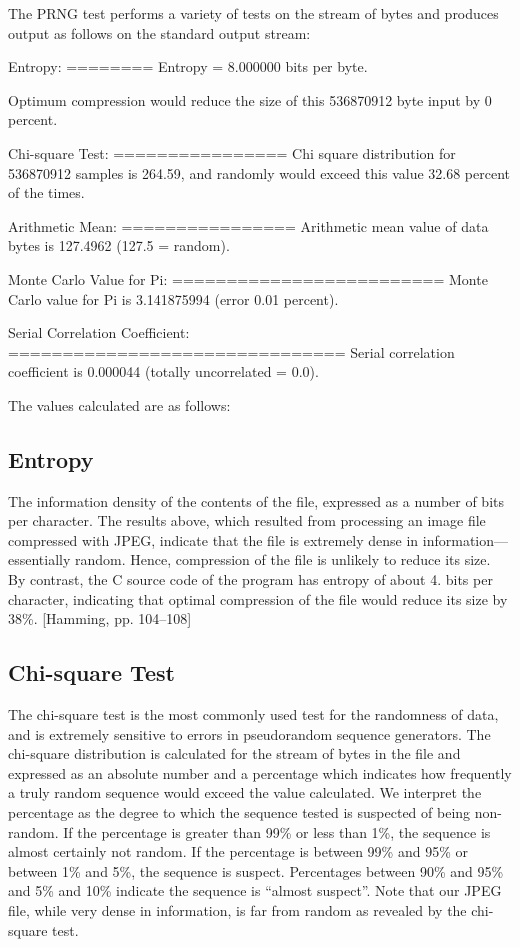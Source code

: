 The P\-R\-N\-G test performs a variety of tests on the stream of bytes and produces output as follows on the standard output stream\-: \begin{DoxyVerb}Entropy:
========
Entropy = 8.000000 bits per byte.

Optimum compression would reduce the size
of this 536870912 byte input by 0 percent.

Chi-square Test:
================
Chi square distribution for 536870912 samples is 264.59, and randomly
would exceed this value 32.68 percent of the times.

Arithmetic Mean:
================
Arithmetic mean value of data bytes is 127.4962 (127.5 = random).

Monte Carlo Value for Pi:
=========================
Monte Carlo value for Pi is 3.141875994 (error 0.01 percent).

Serial Correlation Coefficient:
===============================
Serial correlation coefficient is 0.000044 (totally uncorrelated = 0.0).
\end{DoxyVerb}


The values calculated are as follows\-:

\subsection*{Entropy}

The information density of the contents of the file, expressed as a number of bits per character. The results above, which resulted from processing an image file compressed with J\-P\-E\-G, indicate that the file is extremely dense in information—essentially random. Hence, compression of the file is unlikely to reduce its size. By contrast, the C source code of the program has entropy of about 4. bits per character, indicating that optimal compression of the file would reduce its size by 38\%. \mbox{[}Hamming, pp. 104–108\mbox{]}

\subsection*{Chi-\/square Test}

The chi-\/square test is the most commonly used test for the randomness of data, and is extremely sensitive to errors in pseudorandom sequence generators. The chi-\/square distribution is calculated for the stream of bytes in the file and expressed as an absolute number and a percentage which indicates how frequently a truly random sequence would exceed the value calculated. We interpret the percentage as the degree to which the sequence tested is suspected of being non-\/random. If the percentage is greater than 99\% or less than 1\%, the sequence is almost certainly not random. If the percentage is between 99\% and 95\% or between 1\% and 5\%, the sequence is suspect. Percentages between 90\% and 95\% and 5\% and 10\% indicate the sequence is “almost suspect”. Note that our J\-P\-E\-G file, while very dense in information, is far from random as revealed by the chi-\/square test.

